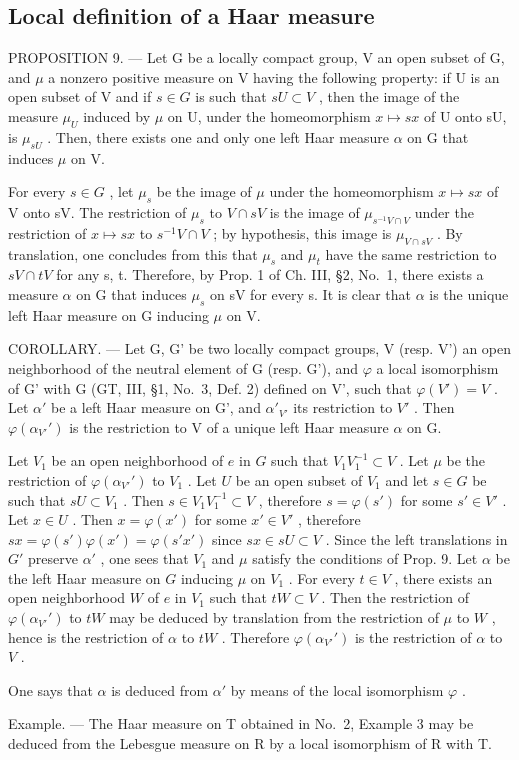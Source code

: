 \subsection{Local definition of a Haar measure}

PROPOSITION 9. --- Let G be a locally compact group, V an open subset of G, and \(\mu\) a nonzero positive measure on V having the following property: if U is an open subset of V and if \(s \in G\) is such that \(sU \subset V\) , then the image of the measure \(\mu_{U}\) induced by \(\mu\) on U, under the homeomorphism \(x \mapsto sx\) of U onto sU, is \(\mu_{sU}\) . Then, there exists one and only one left Haar measure \(\alpha\) on G that induces \(\mu\) on V.

For every \(s \in G\) , let \(\mu_{s}\) be the image of \(\mu\) under the homeomorphism \(x \mapsto sx\) of V onto sV. The restriction of \(\mu_{s}\) to \(V \cap sV\) is the image of \(\mu_{s^{-1}V \cap V}\) under the restriction of \(x \mapsto sx\) to \(s^{-1}V \cap V\) ; by hypothesis, this image is \(\mu_{V \cap sV}\) . By translation, one concludes from this that \(\mu_{s}\) and \(\mu_{t}\) have the same restriction to \(sV \cap tV\) for any s, t. Therefore, by Prop. 1 of Ch. III, §2, No.~1, there exists a measure \(\alpha\) on G that induces \(\mu_{s}\) on sV for every s. It is clear that \(\alpha\) is the unique left Haar measure on G inducing \(\mu\) on V.

COROLLARY. --- Let G, G' be two locally compact groups, V (resp. V') an open neighborhood of the neutral element of G (resp. G'), and \(\varphi\) a local isomorphism of G' with G (GT, III, §1, No.~3, Def. 2) defined on V', such that \(\varphi(V') = V\) . Let \(\alpha'\) be a left Haar measure on G', and \(\alpha'_{V'}\) its restriction to \(V'\) . Then \(\varphi(\alpha_{V'}')\) is the restriction to V of a unique left Haar measure \(\alpha\) on G.

Let \(V_1\) be an open neighborhood of \(e\) in \(G\) such that \(V_1V_1^{-1} \subset V\) . Let \(\mu\) be the restriction of \(\varphi(\alpha_{V'}')\) to \(V_1\) . Let \(U\) be an open subset of \(V_1\) and let \(s \in G\) be such that \(sU \subset V_1\) . Then \(s \in V_1V_1^{-1} \subset V\) , therefore \(s = \varphi(s')\) for some \(s' \in V'\) . Let \(x \in U\) . Then \(x = \varphi(x')\) for some \(x' \in V'\) , therefore \(sx = \varphi(s')\varphi(x') = \varphi(s'x')\) since \(sx \in sU \subset V\) . Since the left translations in \(G'\) preserve \(\alpha'\) , one sees that \(V_1\) and \(\mu\) satisfy the conditions of Prop. 9. Let \(\alpha\) be the left Haar measure on \(G\) inducing \(\mu\) on \(V_1\) . For every \(t \in V\) , there exists an open neighborhood \(W\) of \(e\) in \(V_1\) such that \(tW \subset V\) . Then the restriction of \(\varphi(\alpha_{V'}')\) to \(tW\) may be deduced by translation from the restriction of \(\mu\) to \(W\) , hence is the restriction of \(\alpha\) to \(tW\) . Therefore \(\varphi(\alpha_{V'}')\) is the restriction of \(\alpha\) to \(V\) .

One says that \(\alpha\) is deduced from \(\alpha'\) by means of the local isomorphism \(\varphi\) .

Example. --- The Haar measure on T obtained in No.~2, Example 3 may be deduced from the Lebesgue measure on R by a local isomorphism of R with T.

